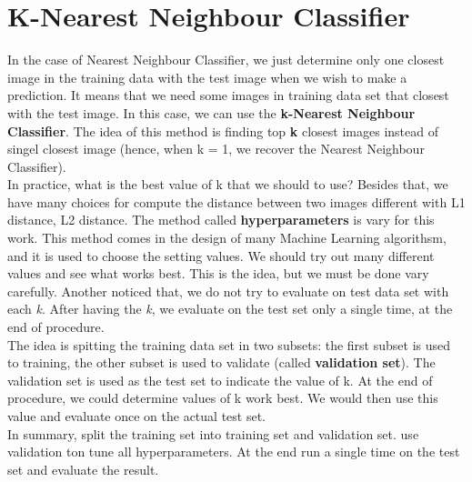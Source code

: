 \section{K-Nearest Neighbour Classifier}
In the case of Nearest Neighbour Classifier, we just determine only one closest image in the training data with the test image when we wish to make a prediction. It means that we need some images in training data set that closest with the test image. In this case, we can use the \textbf{k-Nearest Neighbour Classifier}. The idea of this method is finding top \textbf{k} closest images instead of singel closest image (hence, when k = 1, we recover the Nearest Neighbour Classifier).\\[0.2cm]
In practice, what is the best value of k that we should to use? Besides that, we have many choices for  compute the distance between two images different with  L1 distance, L2 distance. The method called \textbf{hyperparameters} is vary for this work. This method comes in the design of many Machine Learning algorithsm, and it is used to choose the setting values. We should try out many different values and  see what works best. This is the idea, but we must be done vary carefully. Another noticed that, we do not try to evaluate on test data set with each \textit{k}. After having the \textit{k}, we evaluate on the test set only a single time, at the end of procedure.\\[0.2cm]
The idea is spitting the training data set in two subsets: the first subset is used to training, the other subset is used to validate (called \textbf{validation set}). The validation set is used as the test set to indicate the value of k. At the end of procedure, we could determine values of k work best. We would then use this value and evaluate once on the actual test set.\\[0.2cm]
In summary, split the training set into training set and validation set. use validation ton tune all hyperparameters. At the end run a single time on the test set and evaluate the result.
